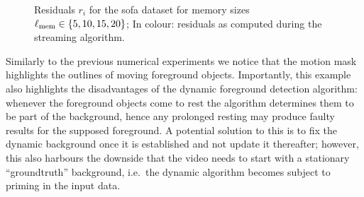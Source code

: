 \begin{figure}[!ht]
    \centering
    \caption{Residuals $r_i$ for the sofa dataset for memory sizes $\ell_\text{mem} \in \left\{5, 10, 15, 20\right\}$; In colour: residuals as computed during the streaming algorithm.}\label{fig:sofa-exp-residual}
\end{figure}

Similarly to the previous numerical experiments we notice that the motion mask highlights the outlines of moving foreground objects. Importantly, this example also highlights the disadvantages of the dynamic foreground detection algorithm: whenever the foreground objects come to rest the algorithm determines them to be part of the background, hence any prolonged resting may produce faulty results for the supposed foreground. A potential solution to this is to fix the dynamic background once it is established and not update it thereafter; however, this also harbours the downside that the video needs to start with a stationary ``groundtruth'' background, i.e.\ the dynamic algorithm becomes subject to priming in the input data.

